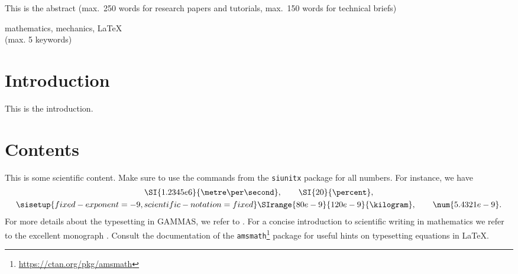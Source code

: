 \documentclass[usebibtex]{gammas}
\theoremstyle{definition}
\begin{document}
\maketitle


\begin{gammabstract}
	This is the abstract (max.\ 250 words for research papers and tutorials, max.\ 150 words for technical briefs)
\end{gammabstract}

\begin{gammkeywords}
	mathematics, mechanics, \LaTeX \\ (max. 5 keywords)
\end{gammkeywords}

\section{Introduction}
This is the introduction.

\section{Contents}
This is some scientific content. Make sure to use the commands from the \texttt{siunitx} package for all numbers. For instance, we have
\begin{gather*}
	\SI{1.2345e6}{\metre\per\second}, \qquad \SI{20}{\percent},\\
	{\sisetup{fixed-exponent=-9,scientific-notation=fixed}\SIrange{80e-9}{120e-9}{\kilogram}}, \qquad \num{5.4321e-9}.
\end{gather*}
For more details about the typesetting in GAMMAS, we refer to \cite{kern2019gammas}. For a concise introduction to scientific writing
in mathematics we refer to the excellent monograph \cite{higham1998handbook}. Consult the documentation of the \texttt{amsmath}\footnote{\url{https://ctan.org/pkg/amsmath}} package for useful hints on typesetting equations in \LaTeX{}.
\end{document}
